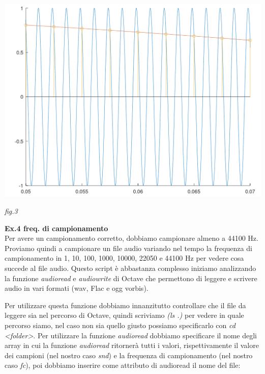 \documentclass[11pt]{article}
\begin{document}
\begin{multicols*}{2}
\begin{center}
\includegraphics[scale=0.2]{images/plot04.png}

{\scriptsize \emph{fig.3 }}
\end{center}

\textbf{\textsf {Ex.4 freq. di campionamento}}\\

\noindent Per avere un campionamento corretto, dobbiamo campionare almeno a 44100 Hz. Proviamo quindi a campionare un file audio variando nel tempo la frequenza di campionamento in 1, 10, 100, 1000, 10000, 22050 e 44100 Hz per vedere cosa succede al file audio. Questo script è abbastanza complesso iniziamo analizzando la funzione \textit {audioread} e \textit {audiowrite} di Octave che permettono di leggere e scrivere audio in vari formati (wav, Flac e ogg vorbis). 

Per utilizzare questa funzione dobbiamo innanzitutto controllare che il file da leggere sia nel percorso di Octave, quindi scriviamo \textit {(ls .)} per vedere in quale percorso siamo, nel caso non sia quello giusto possiamo specificarlo con \textit {cd <folder>}. Per utilizzare la funzione \textit {audioread} dobbiamo specificare il nome degli array in cui la funzione \textit {audioread} ritornerà tutti i valori, rispettivamente il valore dei campioni (nel nostro caso \textit {snd}) e la frequenza di campionamento (nel nostro caso \textit {fc}), poi dobbiamo inserire come attributo di audioread il nome del file:

\vspace{0.3cm}

\begin{center}
\begin{minipage}[c]{6cm}
\begin{sffamily}


\end{sffamily}
\end{minipage}
\end{center}
\end{multicols*}
\end{document}
